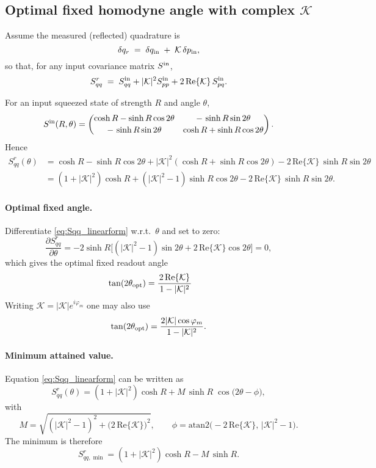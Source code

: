 \subsection*{Optimal fixed homodyne angle with complex \texorpdfstring{$\mathcal{K}$}{K}}

Assume the measured (reflected) quadrature is
\[
\delta q_r \;=\; \delta q_{\rm in} \;+\; \mathcal{K}\,\delta p_{\rm in},
\]
so that, for any input covariance matrix \(S^{\rm in}\),
\[
S^{r}_{qq} \;=\; S^{\rm in}_{qq} + |\mathcal{K}|^{2}S^{\rm in}_{pp} + 2\,\mathrm{Re}\{\mathcal{K}\}\,S^{\rm in}_{pq}.
\]

For an input squeezed state of strength \(R\) and angle \(\theta\),
\[
S^{\rm in}(R,\theta)=
\begin{pmatrix}
\cosh R - \sinh R \cos 2\theta & -\,\sinh R \sin 2\theta\\[2pt]
-\,\sinh R \sin 2\theta & \cosh R + \sinh R \cos 2\theta
\end{pmatrix}.
\]
Hence
\begin{align}
S^{r}_{qq}(\theta)
&= \cosh R - \sinh R \cos 2\theta
 + |\mathcal{K}|^{2}\!\left(\cosh R + \sinh R \cos 2\theta\right)
 - 2\,\mathrm{Re}\{\mathcal{K}\}\,\sinh R \sin 2\theta \nonumber\\[2pt]
&= (1+|\mathcal{K}|^{2})\cosh R
  + (|\mathcal{K}|^{2}-1)\sinh R \cos 2\theta
  - 2\,\mathrm{Re}\{\mathcal{K}\}\,\sinh R \sin 2\theta .
\label{eq:Sqq_linearform}
\end{align}

\paragraph{Optimal fixed angle.}
Differentiate \eqref{eq:Sqq_linearform} w.r.t.~\(\theta\) and set to zero:
\[
\frac{\partial S^{r}_{qq}}{\partial \theta}
= -2\sinh R\Big[(|\mathcal{K}|^{2}-1)\sin 2\theta + 2\,\mathrm{Re}\{\mathcal{K}\}\cos 2\theta\Big]=0,
\]
which gives the optimal fixed readout angle
\begin{equation}
\tan(2\theta_{\rm opt})
= \frac{2\,\mathrm{Re}\{\mathcal{K}\}}{\,1-|\mathcal{K}|^{2}\,}
\qquad
\label{eq:theta_opt}
\end{equation}
Writing \(\mathcal{K}=|\mathcal{K}|e^{i\varphi_m}\) one may also use
\[
\tan(2\theta_{\rm opt})=\frac{2|\mathcal{K}|\cos\varphi_m}{\,1-|\mathcal{K}|^{2}\,}.
\]

\paragraph{Minimum attained value.}
Equation \eqref{eq:Sqq_linearform} can be written as
\[
S^{r}_{qq}(\theta)
=(1+|\mathcal{K}|^{2})\cosh R
+ M\,\sinh R\;\cos\!\big(2\theta-\phi\big),
\]
with
\[
M=\sqrt{(|\mathcal{K}|^{2}-1)^{2}+\big(2\,\mathrm{Re}\{\mathcal{K}\}\big)^{2}},
\qquad
\phi=\mathrm{atan2}\!\big(-2\,\mathrm{Re}\{\mathcal{K}\},\,|\mathcal{K}|^{2}-1\big).
\]
The minimum is therefore
\begin{equation}
\boxed{\quad
S^{r}_{qq,\min}
=(1+|\mathcal{K}|^{2})\cosh R - M\,\sinh R .
\quad}
\label{eq:Smin_general}
\end{equation}

